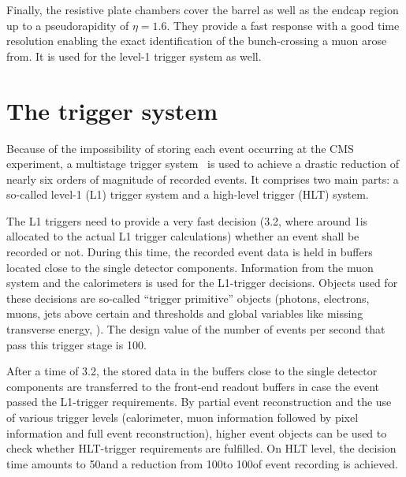 Finally, the resistive plate chambers cover the barrel as well as the endcap region up to a pseudorapidity of $\eta=1.6$. 
They provide a fast response with a good time resolution enabling the exact identification of the bunch-crossing a muon arose from.
It is used for the level-1 trigger system as well.
\section{The trigger system}
Because of the impossibility of storing each event occurring at the CMS experiment, a multistage trigger system~\cite{bib:CMS:TDR_2006} is used to achieve a drastic reduction of nearly six orders of magnitude of recorded events.
It comprises two main parts: a so-called level-1 (L1) trigger system and a high-level trigger (HLT) system.

The L1 triggers need to provide a very fast decision (3.2\mus, where around 1\mus is allocated to the actual L1 trigger calculations) whether an event shall be recorded or not.
During this time, the recorded event data is held in buffers located close to the single detector components.
Information from the muon system and the calorimeters is used for the L1-trigger decisions.
Objects used for these decisions are so-called ``trigger primitive'' objects (photons, electrons, muons, jets above certain \et and \pt thresholds and global variables like missing transverse energy, \met). 
The design value of the number of events per second that pass this trigger stage is 100\khz.

After a time of 3.2\mus, the stored data in the buffers close to the single detector components are transferred to the front-end readout buffers in case the event passed the L1-trigger requirements.
By partial event reconstruction and the use of various trigger levels (calorimeter, muon information followed by pixel information and full event reconstruction), higher event objects can be used to check whether HLT-trigger requirements are fulfilled.
On HLT level, the decision time amounts to 50\ms and a reduction from 100\khz to 100\hz of event recording is achieved.

\FloatBarrier
